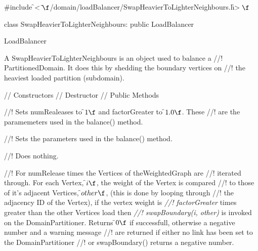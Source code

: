 
\indent \#include \f$<\tilde{ }\f$/domain/loadBalancer/SwapHeavierToLighterNeighbours.h\f$>\f$

\indent class SwapHeavierToLighterNeighbours: public LoadBalancer

\indent  LoadBalancer
\indent{}


\indent A SwapHeavierToLighterNeighbours is an object used to balance a
//! PartitionedDomain. It does this by shedding the boundary vertices on
//! the heaviest loaded partition (subdomain).

\indent\indent  // Constructors
\indent{} 
\indent{}
\indent\indent // Destructor
\indent{}
\indent\indent // Public Methods
\indent{}


//! Sets \p numRealeases to \f$1\f$ and \p factorGreater to \f$1.0\f$. These
//! are the paramemeters used in the balance() method.

//! Sets the parameters used in the balance() method.

//! Does nothing.

//! For \p numRelease times the Vertices of \p theWeightedGraph are
//! iterated through. For each Vertex, \f$i\f$, the weight of the Vertex is compared
//! to those of it's adjacent Vertices, \f$other\f$, (this is done by looping through
//! the adjacency ID of the Vertex), if the vertex weight is {\em
//! factorGreater} times greater than the other Vertices load then {\em
//! swapBoundary(i, other)} is invoked on the DomainPartitioner. Returns
\f$0\f$ if successfull, otherwise a negative number and a warning message
//! are returned if either no link has been set to the DomainPartitioner
//! or swapBoundary() returns a negative number.



